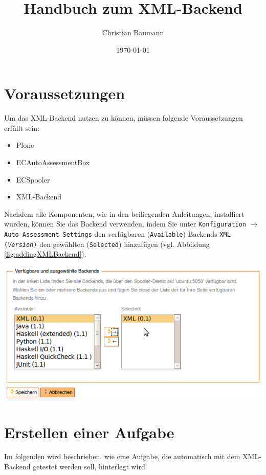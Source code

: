\documentclass[a4paper]{scrartcl}
\title{Handbuch zum XML-Backend}
\author{Christian Baumann}
\date{\today}
\newcommand{\anf}[1]{\glqq{}#1\grqq{}}
\begin{document}
  \maketitle
  
  \newpage
  
  \tableofcontents
  
  \newpage
  
	\section{Voraussetzungen}
	Um das XML-Backend nutzen zu können, müssen folgende Voraussetzungen erfüllt sein:
	\begin{itemize}
	  \item Plone
	  \item ECAutoAssessmentBox
	  \item ECSpooler
	  \item XML-Backend
	\end{itemize}
	Nachdem alle Komponenten, wie in den beiliegenden Anleitungen, installiert wurden, können Sie das Backend verwenden, indem Sie unter \texttt{Konfiguration} $\rightarrow$ \texttt{Auto Assessment Settings} den verfügbaren (\texttt{Available}) Backends \anf{\texttt{XML (\textit{Version})}} den gewählten (\texttt{Selected}) hinzufügen (vgl. Abbildung \ref{fig:addingXMLBackend}).
	
  \begin{center}
    \captionsetup{type=figure}
	  \includegraphics[width=1\textwidth]{images/AddingXMLBackend.png}
	  \label{fig:addingXMLBackend}
  \end{center}
	
	\section{Erstellen einer Aufgabe}
	  Im folgenden wird beschrieben, wie eine Aufgabe, die automatisch mit dem XML-Backend getestet werden soll, hinterlegt wird.
	  
\end{document}
